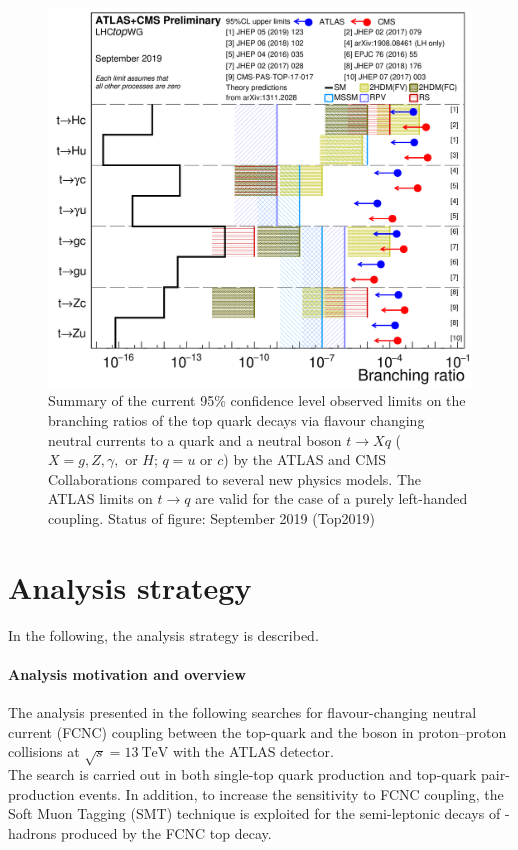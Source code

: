 \begin{figure}[htb]
	\centering
	\includegraphics[scale=0.15]{Chapters/CH5/figures/fcnc_summarybsm}
	\caption{Summary of the current 95\% confidence level observed limits on the branching ratios of the top quark decays via flavour changing neutral currents to a quark and a neutral boson $t\rightarrow Xq$ ($X = g, Z, \gamma,$ or $H$; $q = u$ or $c$) by the ATLAS and CMS Collaborations compared to several new physics models. The ATLAS limits on $t \rightarrow q$ are valid for the case of a purely left-handed coupling. Status of figure: September 2019 (Top2019)}
	\label{fig:intro:limits}
\end{figure}

\clearpage
\section{Analysis strategy}
In the following, the analysis strategy is described.

\paragraph{Analysis motivation and overview}
The analysis presented in the following searches for flavour-changing
neutral current (FCNC) coupling between the top-quark and the \PZ
boson in proton--proton collisions at $\sqrt{s} = \SI{13}{\TeV}$ with
the ATLAS detector. \\
The search is carried out in both single-top quark production and
top-quark pair-production events. In addition, to increase the sensitivity to FCNC \tZc coupling, 
the Soft Muon Tagging (SMT) technique is exploited for
the semi-leptonic decays of \Pqc-hadrons produced by the FCNC top
decay. 

